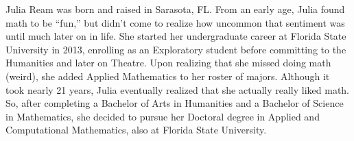 \documentclass[11pt,expanded,copyright]{fsuthesis}
\begin{document}
\mainmatter








\renewcommand*{\appendixtocname}{Appendices} %
\appendix








\printbibliography

%

\begin{biosketch}
Julia Ream was born and raised in Sarasota, FL. From an early age, Julia found math to be ``fun,'' but didn't come to realize how uncommon that sentiment was until much later on in life. She started her undergraduate career at Florida State University in 2013, enrolling as an Exploratory student before committing to the Humanities and later on Theatre. Upon realizing that she missed doing math (weird), she added Applied Mathematics to her roster of majors. Although it took nearly 21 years, Julia eventually realized that she actually really liked math. So, after completing a Bachelor of Arts in Humanities and a Bachelor of Science in Mathematics, she decided to pursue her Doctoral degree in Applied and Computational Mathematics, also at Florida State University. 
\end{biosketch}
\end{document}
